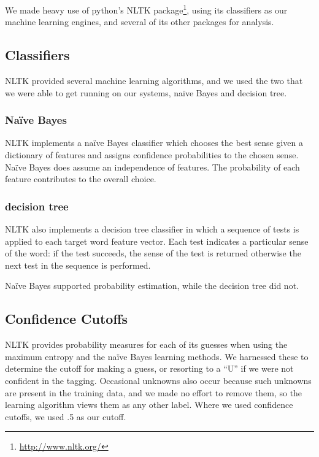 \documentclass{article}
\newcommand{\naive}{na\"ive}
\newcommand{\Naive}{Na\"ive}
\begin{document}
We made heavy use of python's NLTK
package\footnote{\url{http://www.nltk.org/}}, using its classifiers as our
machine learning engines, and several of its other packages for analysis.

\subsection{Classifiers}

NLTK provided several machine learning algorithms, and we used the two that we
were able to get running on our systems, \naive{} Bayes and decision tree.  

\subsubsection{\Naive{} Bayes}

NLTK implements a \naive{} Bayes classifier which chooses the best sense given a
dictionary of features and assigns confidence probabilities to the chosen
sense. \Naive{} Bayes does assume an independence of features. The probability of
each feature contributes to the overall choice.

\subsubsection{decision tree}

NLTK also implements a decision tree classifier in which a sequence of tests is
applied to each target word feature vector. Each test indicates a particular
sense of the word: if the test succeeds, the sense of the test is returned
otherwise the next test in the sequence is performed.

\Naive{} Bayes supported probability estimation, while the decision tree did not.

\subsection{Confidence Cutoffs}

NLTK provides probability measures for each of its guesses when using the
maximum entropy and the \naive{} Bayes learning methods.  We harnessed these to
determine the cutoff for making a guess, or resorting to a ``U'' if we were not
confident in the tagging.  Occasional unknowns also occur because such unknowns
are present in the training data, and we made no effort to remove them, so the
learning algorithm views them as any other label.  Where we used confidence
cutoffs, we used .5 as our cutoff.
\end{document}

